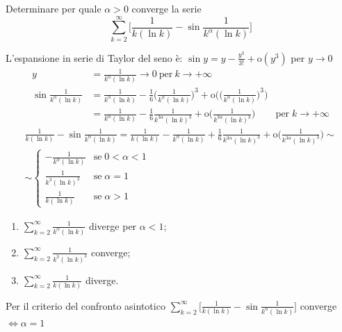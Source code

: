 \newpage
\begin{exbar}
	\begin{example}
		Determinare per quale $\alpha>0$ converge la serie 
		\begin{equation*}
			\sum_{k=2}^\infty \bigg[\frac{1}{k(\ln k)} - \sin \frac{1}{k^\alpha(\ln k)} \bigg]
		\end{equation*}
		
		L'espansione in serie di Taylor del seno è: $\sin y = y - \frac{y^3}{3!} + \mathrm{o}(y^3)$ per $y\rightarrow0$
		\begin{align*}
			y &= \frac{1}{k^\alpha(\ln k)} \rightarrow 0 \ \text{per} \ k\rightarrow+\infty
			\\
			\sin \frac{1}{k^\alpha (\ln k)}
			&= \frac{1}{k^\alpha (\ln k)} - \frac{1}{6} \bigg(\frac{1}{k^\alpha (\ln k)} \bigg)^3 + \mathrm{o}\bigg( \bigg(\frac{1}{k^\alpha (\ln k)} \bigg)^3 \bigg) 
			\\
			&= \frac{1}{k^\alpha (\ln k)} - \frac{1}{6} \frac{1}{k^{3\alpha}(\ln k)^3} + \mathrm{o}\bigg(\frac{1}{k^{3\alpha}(\ln k)^3} \bigg) & \mathrm{per} \; k \rightarrow + \infty
		\end{align*}
		\begin{gather*}
		\frac{1}{k (\ln k)} - \sin\frac{1}{k^\alpha(\ln k)} = \frac{1}{k (\ln k)} -\frac{1}{k^\alpha (\ln k)} + \frac{1}{6} \frac{1}{k^{3\alpha}(\ln k)^3} + \mathrm{o}\bigg(\frac{1}{k^{3\alpha}(\ln k)^3} \bigg) \sim
		\\
		\sim \begin{cases}
				-\frac{1}{k^\alpha (\ln k)} & \mathrm{se} \; 0<\alpha<1 
				\\[1em]
				\frac{1}{k^3(\ln k)^3} & \mathrm{se} \; \alpha = 1 
				\\[1em]
				\frac{1}{k (\ln k)} & \mathrm{se} \; \alpha > 1
			\end{cases}
		\end{gather*}
		
		\begin{enumerate}
			\item $\sum_{k=2}^\infty \frac{1}{k^\alpha (\ln k)}$ diverge per $\alpha < 1$;
			\item $\sum_{k=2}^\infty \frac{1}{k^3 (\ln k)^3}$ converge;
			\item $\sum_{k=2}^\infty \frac{1}{k (\ln k)}$ diverge.
		\end{enumerate}
		
		Per il criterio del confronto asintotico
		$\sum_{k=2}^\infty \bigg[\frac{1}{k (\ln k)} - \sin \frac{1}{k^\alpha (\ln k)} \bigg]$ converge $\iff \alpha=1$
	\end{example}
\end{exbar}

